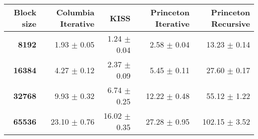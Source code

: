 \begin{tabular}{rrrrr}\toprule
\textbf{Block size}  & \textbf{Columbia Iterative} & \textbf{KISS} & \textbf{Princeton Iterative} & \textbf{Princeton Recursive}\\\midrule
\textbf{8192}  & 1.93 $\pm$ 0.05 & 1.24 $\pm$ 0.04 & 2.58 $\pm$ 0.04 & 13.23 $\pm$ 0.14\\
\textbf{16384}  & 4.27 $\pm$ 0.12 & 2.37 $\pm$ 0.09 & 5.45 $\pm$ 0.11 & 27.60 $\pm$ 0.17\\
\textbf{32768}  & 9.93 $\pm$ 0.32 & 6.74 $\pm$ 0.25 & 12.22 $\pm$ 0.48 & 55.12 $\pm$ 1.22\\
\textbf{65536} & 23.10 $\pm$ 0.76 & 16.02 $\pm$ 0.35 & 27.28 $\pm$ 0.95 & 102.15 $\pm$ 3.52\\
\bottomrule
\end{tabular}
